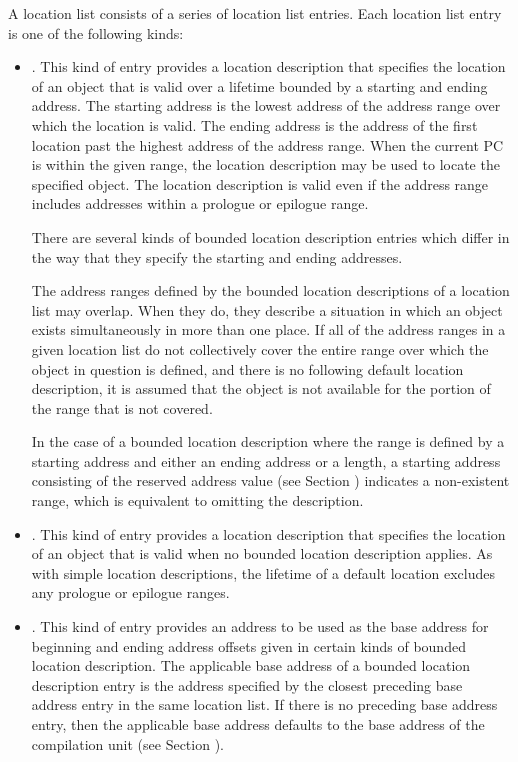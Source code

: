A location list consists of a series of location list entries.
Each location list entry is one of the following kinds:
\begin{itemize}
\item {}. 
\label{text:bndlocdesc}
\bbeb
This kind of entry provides a
location description that specifies the location of
an object that is valid over a lifetime bounded
by a starting and ending address. The starting address is the
lowest address of the address range over which the location
is valid. The ending address is the address of the first
location past the highest address of the address range.
When the current PC is within the given range, the location
description may be used to locate the specified object.
\bb
The location description is valid even if the address range 
includes addresses within a prologue or epilogue range.
\eb
        
There are several kinds of bounded location description
entries which differ in the way that they specify the
starting and ending addresses.

The address ranges defined by the bounded location descriptions
of a location list may overlap. When they do, they describe a
situation in which an object exists simultaneously in more than
one place. If all of the address ranges in a given location
list do not collectively cover the entire range over which the
object in question is defined, and there is no following default
location description, it is assumed that the object is not
available for the portion of the range that is not covered.

\bb
{}
In the case of a bounded location description where the range is defined
by a starting address and either an ending address or a length, a
starting address consisting of the reserved address value (see Section
) indicates a non-existent range, 
which is equivalent to omitting the description.
\eb

\item {}.
This kind of entry provides a
location description that specifies the location of
an object that is valid when no bounded location description
applies.
\bb
As with simple location descriptions, the lifetime of a default 
location excludes any prologue or epilogue ranges.
\eb

\item {}.
This kind of entry provides an address to be
used as the base address for beginning and ending address
offsets given in certain kinds of bounded location description.
The applicable base address of a bounded location description
entry is the address specified by the closest preceding base
address entry in the same location list. If there is no
preceding base address entry, then the applicable base address
defaults to the base address of the compilation unit (see
Section ).


\end{itemize}
